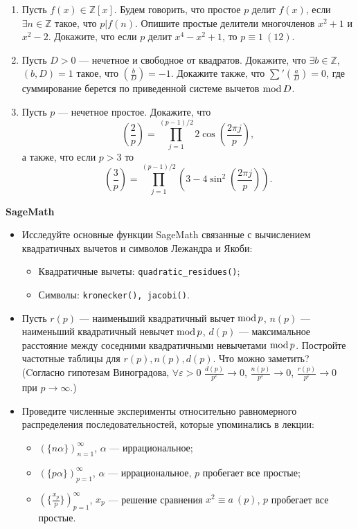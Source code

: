 \begin{enumerate}[topsep=0pt]
    \item Пусть $f(x) \in \mathbb{Z}[x]$. Будем говорить, что простое $p$ делит $f(x)$, если $\exists n \in \mathbb{Z}$ такое, что $p|f(n)$. Опишите простые делители многочленов $x^2+1$ и $x^2-2$. Докажите, что если $p$ делит $x^4-x^2+1$, то $p \equiv 1\ (12)$. %
    \item Пусть $D>0$ --- нечетное и свободное от квадратов. Докажите, что $\exists b\in \mathbb{Z}$, $(b,D)=1$ такое, что $\left(\frac{b}{D}\right)=-1$. Докажите также, что $\sum' \left(\frac{a}{D}\right) = 0$, где суммирование берется по приведенной системе вычетов $\operatorname{mod} D$. %
    \item Пусть $p$ --- нечетное простое. Докажите, что 
    $$
    \left(\frac{2}{p}\right) = \prod_{j=1}^{(p-1)/2} 2\cos\left(\frac{2\pi j}{p}\right),
    $$
    а также, что если $p>3$ то
    $$
    \left(\frac{3}{p}\right) = \prod_{j=1}^{(p-1)/2} \left(3- 4\sin^2\left(\frac{2\pi j}{p}\right) \right).
    $$
\end{enumerate}

\noindent\textbf{SageMath}
\begin{itemize}[topsep=0pt]
    \item Исследуйте основные функции SageMath связанные с вычислением квадратичных вычетов и символов Лежандра и Якоби:
    \begin{itemize}[noitemsep,topsep=0pt]
        \item Квадратичные вычеты: \texttt{quadratic\_residues()};
        \item Символы: \texttt{kronecker(), jacobi()}.
     \end{itemize}

    \item Пусть $r(p)$ --- наименьший квадратичный вычет $\operatorname{mod} p$, $n(p)$ --- наименьший квадратичный невычет $\operatorname{mod} p$, $d(p)$ --- максимальное расстояние между соседними квадратичными невычетами $\operatorname{mod} p$. Постройте частотные таблицы для $r(p), n(p), d(p)$. Что можно заметить?\\
    (Cогласно гипотезам Виноградова, $\forall \varepsilon > 0$ $\frac{d(p)}{p^\varepsilon} \rightarrow 0$, $\frac{n(p)}{p^\varepsilon} \rightarrow 0$, $\frac{r(p)}{p^\varepsilon} \rightarrow 0$ при $p \rightarrow \infty$.)
    
    \item  Проведите численные эксперименты относительно равномерного распределения последовательностей, которые упоминались в лекции: \begin{itemize}[noitemsep,topsep=0pt]
        \item $(\{n\alpha\})_{n=1}^\infty$, $\alpha$ --- иррациональное;
        \item $(\{p\alpha\})_{p=1}^\infty$, $\alpha$ --- иррациональное, $p$ пробегает все простые;
        \item $(\{\frac{x_p}{p}\})_{p=1}^\infty$, $x_p$ --- решение сравнения $x^2 \equiv a\ (p)$, $p$ пробегает все простые.
     \end{itemize}
\end{itemize}

